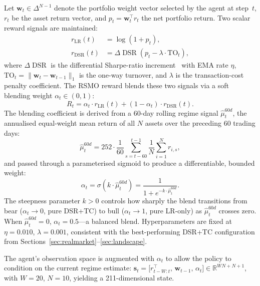 \documentclass[conference]{IEEEtran}
\begin{document}
Let $\mathbf{w}_t \in \Delta^{N-1}$ denote the portfolio weight vector
selected by the agent at step~$t$, $r_t$ be the asset return vector,
and $p_t = \mathbf{w}_t^\top r_t$ the net portfolio return.
Two scalar reward signals are maintained:
\begin{align}
r_{\mathrm{LR}}(t) &= \log(1 + p_t), \label{eq:rlr}\\
r_{\mathrm{DSR}}(t) &= \Delta\!\operatorname{DSR}(p_t - \lambda\cdot\mathrm{TO}_t),
  \label{eq:rdsr}
\end{align}
where $\Delta\!\operatorname{DSR}$ is the differential Sharpe-ratio
increment~\cite{Moody2001} with EMA rate $\eta$,
$\mathrm{TO}_t = \|\mathbf{w}_t - \mathbf{w}_{t-1}\|_1$ is the
one-way turnover, and $\lambda$ is the transaction-cost penalty
coefficient. The RSMO reward blends these two signals via a soft
blending weight $\alpha_t \in (0,1)$:
\begin{equation}
R_t = \alpha_t \cdot r_{\mathrm{LR}}(t) + (1 - \alpha_t) \cdot
      r_{\mathrm{DSR}}(t). \label{eq:rsmo}
\end{equation}
The blending coefficient is derived from a 60-day rolling regime signal
$\hat{\mu}^{60d}_t$, the annualised equal-weight mean return of all
$N$ assets over the preceding 60 trading days:
\begin{equation}
\hat{\mu}^{60d}_t = 252 \cdot \frac{1}{60} \sum_{s=t-60}^{t-1}
  \frac{1}{N} \sum_{i=1}^{N} r_{i,s}, \label{eq:mu60}
\end{equation}
and passed through a parameterised sigmoid to produce a differentiable,
bounded weight:
\begin{equation}
\alpha_t = \sigma(k \cdot \hat{\mu}^{60d}_t) = \frac{1}{1 +
  e^{-k \cdot \hat{\mu}^{60d}_t}}. \label{eq:alpha}
\end{equation}
The steepness parameter $k > 0$ controls how sharply the blend
transitions from bear ($\alpha_t \to 0$, pure DSR+TC) to bull
($\alpha_t \to 1$, pure LR-only) as $\hat{\mu}^{60d}_t$ crosses zero.
When $\hat{\mu}^{60d}_t = 0$, $\alpha_t = 0.5$—a balanced blend.
Hyperparameters are fixed at $\eta = 0.010$, $\lambda = 0.001$,
consistent with the best-performing DSR+TC configuration from
Sections~\ref{sec:realmarket}--\ref{sec:landscape}.

The agent's observation space is augmented with $\alpha_t$ to allow the
policy to condition on the current regime estimate:
$\mathbf{s}_t = \bigl[r_{t-W:t}^{\intercal},\, \mathbf{w}_{t-1},\,
\alpha_t\bigr] \in \mathbb{R}^{WN + N + 1}$, with $W=20$, $N=10$,
yielding a 211-dimensional state.
\end{document}
